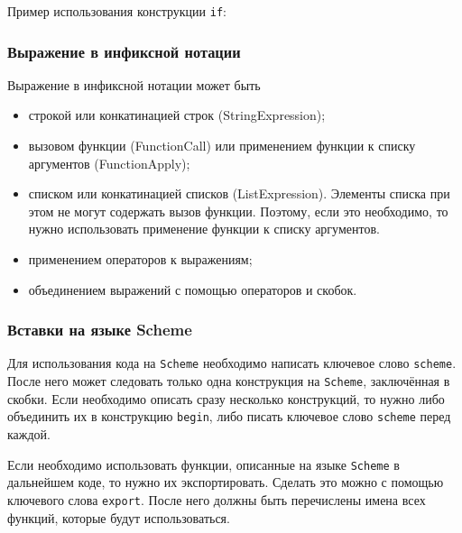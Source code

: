             

            Пример использования конструкции \verb$if$:

            

        \subsubsection{Выражение в инфиксной нотации}
            Выражение в инфиксной нотации может быть
            \begin{itemize}
                \item строкой или конкатинацией строк (StringExpression);
                \item вызовом функции (FunctionCall) или применением функции к списку аргументов (FunctionApply);
                \item списком или конкатинацией списков (ListExpression).
                    Элементы списка при этом не могут содержать вызов функции.
                    Поэтому, если это необходимо, то нужно использовать применение функции к списку аргументов.
                \item применением операторов к выражениям;
                \item объединением выражений с помощью операторов и скобок.
            \end{itemize}
            
            

        \subsubsection{Вставки на языке Scheme}
            Для использования кода на \verb$Scheme$ необходимо написать ключевое слово \verb$scheme$.
            После него может следовать только одна конструкция на \verb$Scheme$, заключённая в скобки.
            Если необходимо описать сразу несколько конструкций, то нужно либо объединить их в конструкцию \verb$begin$, либо писать ключевое слово \verb$scheme$ перед каждой.
            
            

            Если необходимо использовать функции, описанные на языке \verb$Scheme$ в дальнейшем коде, то нужно их экспортировать.
            Сделать это можно с помощью ключевого слова \verb$export$.
            После него должны быть перечислены имена всех функций, которые будут использоваться.
            
